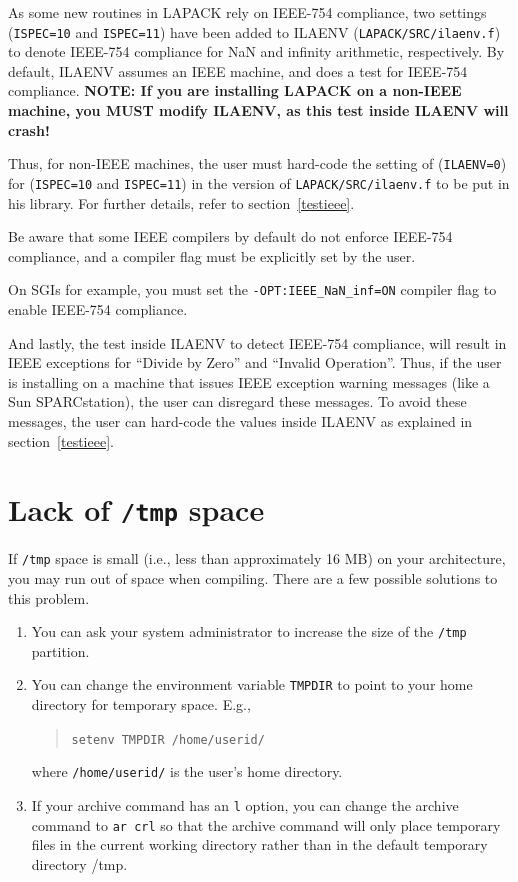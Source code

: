 \documentclass[11pt]{report}
\begin{document}
%

As some new routines in LAPACK rely on IEEE-754 compliance,
two settings (\texttt{ISPEC=10} and \texttt{ISPEC=11}) have been added to ILAENV
(\texttt{LAPACK/SRC/ilaenv.f}) to denote IEEE-754 compliance for NaN and
infinity arithmetic, respectively.  By default, ILAENV assumes an IEEE
machine, and does a test for IEEE-754 compliance.  \textbf{NOTE:  If you
are installing LAPACK on a non-IEEE machine, you MUST modify ILAENV,
as this test inside ILAENV will crash!}

Thus, for non-IEEE machines, the user must hard-code the setting of
(\texttt{ILAENV=0}) for (\texttt{ISPEC=10} and \texttt{ISPEC=11}) in the version
of \texttt{LAPACK/SRC/ilaenv.f} to be put in
his library.  For further details, refer to section~\ref{testieee}.

Be aware
that some IEEE compilers by default do not enforce IEEE-754 compliance, and
a compiler flag must be explicitly set by the user.

On SGIs for example, you must set the \texttt{-OPT:IEEE\_NaN\_inf=ON} compiler
flag to enable IEEE-754 compliance.

And lastly, the test inside ILAENV to detect IEEE-754 compliance, will
result in IEEE exceptions for ``Divide by Zero'' and ``Invalid Operation''.
Thus, if the user is installing on a machine that issues IEEE exception
warning messages (like a Sun SPARCstation), the user can disregard these
messages.  To avoid these messages, the user can hard-code the values
inside ILAENV as explained in section~\ref{testieee}.

\section{Lack of \texttt{/tmp} space}

If \texttt{/tmp} space is small (i.e., less than approximately 16 MB) on your
architecture, you may run out of space
when compiling.  There are a few possible solutions to this problem.
\begin{enumerate}
\item You can ask your system administrator to increase the size of the
\texttt{/tmp} partition.
\item You can change the environment variable \texttt{TMPDIR} to point to
your home directory for temporary space.  E.g.,
\begin{quote}
\texttt{setenv TMPDIR /home/userid/}
\end{quote}
where \texttt{/home/userid/} is the user's home directory.
\item If your archive command has an \texttt{l} option, you can change the
archive command to \texttt{ar crl} so that the
archive command will only place temporary files in the current working
directory rather than in the default temporary directory /tmp.
\end{enumerate}
\end{document}
